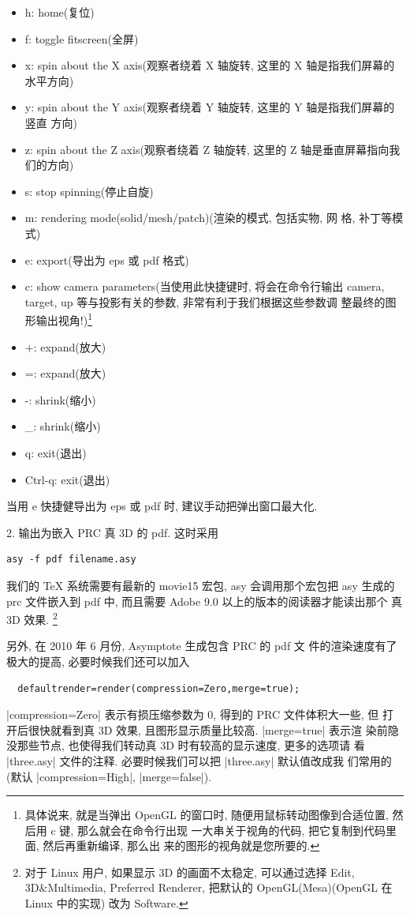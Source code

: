 \documentclass[nofonts,CJKnormalspaces]{ctexbook}
\begin{document}
\begin{itemize}
\item h: home(复位)
\item f: toggle fitscreen(全屏)
\item x: spin about the X axis(观察者绕着 X 轴旋转, 这里的 X 轴是指我们屏幕的
  水平方向)
\item y: spin about the Y axis(观察者绕着 Y 轴旋转, 这里的 Y 轴是指我们屏幕的竖直
  方向)
\item z: spin about the Z axis(观察者绕着 Z 轴旋转, 这里的 Z 轴是垂直屏幕指向我
  们的方向)
\item s: stop spinning(停止自旋)
\item m: rendering mode(solid/mesh/patch)(渲染的模式, 包括实物, 网
  格, 补丁等模式)
\item e: export(导出为 eps 或 pdf 格式)
\item c: show camera parameters(当使用此快捷键时, 将会在命令行输出
  camera, target, up 等与投影有关的参数, 非常有利于我们根据这些参数调
  整最终的图形输出视角!)\footnote{具体说来, 就是当弹出 OpenGL 的窗口时,
    随便用鼠标转动图像到合适位置, 然后用 c 键, 那么就会在命令行出现
    一大串关于视角的代码, 把它复制到代码里面, 然后再重新编译, 那么出
    来的图形的视角就是您所要的.}
\item +: expand(放大)
\item =: expand(放大)
\item -: shrink(缩小)
\item \_: shrink(缩小)
\item q: exit(退出)
\item Ctrl-q: exit(退出)
\end{itemize}
当用 e 快捷健导出为 eps 或 pdf 时, 建议手动把弹出窗口最大化.

2. 输出为嵌入 PRC 真 3D 的 pdf. 这时采用
\begin{verbatim}
asy -f pdf filename.asy
\end{verbatim}

我们的 TeX 系统需要有最新的 movie15 宏包, asy 会调用那个宏包把 asy 生成的
prc 文件嵌入到 pdf 中, 而且需要 Adobe 9.0 以上的版本的阅读器才能读出那个
真 3D 效果. \footnote{对于 Linux 用户, 如果显示 3D 的画面不太稳定, 可以通过选择
Edit, 3D\&Multimedia, Preferred Renderer, 把默认的 OpenGL(Mesa)(OpenGL
在 Linux 中的实现) 改为 Software.}

另外, 在 2010 年 6 月份, Asymptote 生成包含 PRC 的 pdf 文
件的渲染速度有了极大的提高, 必要时候我们还可以加入
\begin{lstlisting}
  defaultrender=render(compression=Zero,merge=true);
\end{lstlisting}
|compression=Zero| 表示有损压缩参数为 0, 得到的 PRC 文件体积大一些, 但
打开后很快就看到真 3D 效果, 且图形显示质量比较高. |merge=true| 表示渲
染前隐没那些节点, 也使得我们转动真 3D 时有较高的显示速度, 更多的选项请
看 |three.asy| 文件的注释. 必要时候我们可以把 |three.asy| 默认值改成我
们常用的(默认 |compression=High|, |merge=false|).
\end{document}
